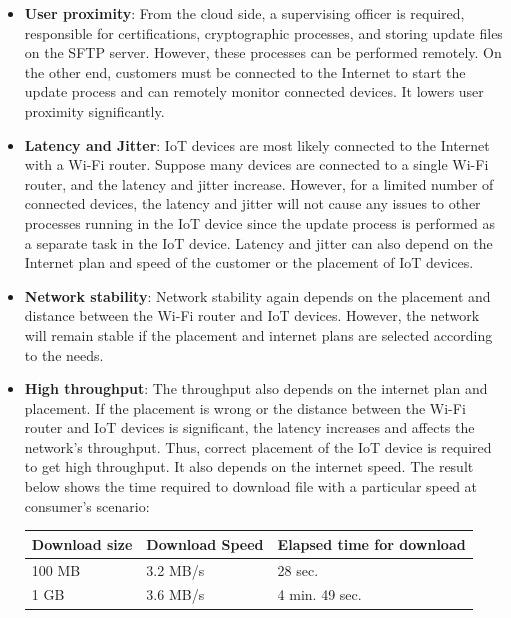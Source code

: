 \documentclass[12pt,a4paper]{article}
\begin{document}
{\begin{itemize}

\item \textbf{User proximity}: From the cloud side, a supervising officer is required, responsible for certifications, cryptographic processes, and storing update files on the SFTP server. However, these processes can be performed remotely. On the other end, customers must be connected to the Internet to start the update process and can remotely monitor connected devices. It lowers user proximity significantly. 

\item \textbf{Latency and Jitter}: IoT devices are most likely connected to the Internet with a Wi-Fi router. Suppose many devices are connected to a single Wi-Fi router, and the latency and jitter increase. However, for a limited number of connected devices, the latency and jitter will not cause any issues to other processes running in the IoT device since the update process is performed as a separate task in the IoT device. Latency and jitter can also depend on the Internet plan and speed of the customer or the placement of IoT devices. 

\item \textbf{Network stability}: Network stability again depends on the placement and distance between the Wi-Fi router and IoT devices. However, the network will remain stable if the placement and internet plans are selected according to the needs. 

\item \textbf{High throughput}: The throughput also depends on the internet plan and placement. If the placement is wrong or the distance between the Wi-Fi router and IoT devices is significant, the latency increases and affects the network's throughput. Thus, correct placement of the IoT device is required to get high throughput. It also depends on the internet speed. The result below shows the time required to download file with a particular speed at consumer's scenario: \\

\begin{tabular}{ |p{3cm}||p{3cm}|p{3cm}|  }
\hline
 Download size& Download Speed & Elapsed time for download\\
 \hline
 100 MB   & 3.2 MB/s    & 28 sec. \\
 1 GB   & 3.6 MB/s    & 4 min. 49 sec. \\
 \hline
\end{tabular}



\end{itemize}}
\end{document}
